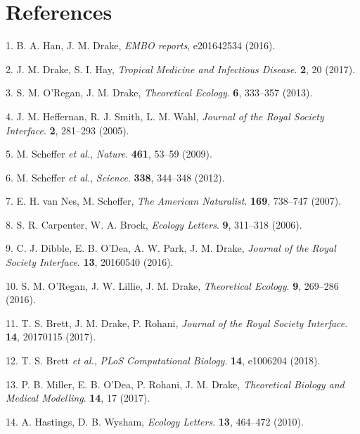 \documentclass[3p]{elsarticle} %
\begin{document}
\section*{References}\label{references}

\hypertarget{refs}{}
\hypertarget{ref-Han2016}{}
1. B. A. Han, J. M. Drake, \emph{EMBO reports}, e201642534 (2016).

\hypertarget{ref-Drake2017}{}
2. J. M. Drake, S. I. Hay, \emph{Tropical Medicine and Infectious
Disease}. \textbf{2}, 20 (2017).

\hypertarget{ref-ORegan2013}{}
3. S. M. O'Regan, J. M. Drake, \emph{Theoretical Ecology}. \textbf{6},
333--357 (2013).

\hypertarget{ref-Heffernan2005}{}
4. J. M. Heffernan, R. J. Smith, L. M. Wahl, \emph{Journal of the Royal
Society Interface}. \textbf{2}, 281--293 (2005).

\hypertarget{ref-Scheffer2009}{}
5. M. Scheffer \emph{et al.}, \emph{Nature}. \textbf{461}, 53--59
(2009).

\hypertarget{ref-Scheffer2012}{}
6. M. Scheffer \emph{et al.}, \emph{Science}. \textbf{338}, 344--348
(2012).

\hypertarget{ref-VanNes2007}{}
7. E. H. van Nes, M. Scheffer, \emph{The American Naturalist}.
\textbf{169}, 738--747 (2007).

\hypertarget{ref-Carpenter2006}{}
8. S. R. Carpenter, W. A. Brock, \emph{Ecology Letters}. \textbf{9},
311--318 (2006).

\hypertarget{ref-Dibble2016}{}
9. C. J. Dibble, E. B. O'Dea, A. W. Park, J. M. Drake, \emph{Journal of
the Royal Society Interface}. \textbf{13}, 20160540 (2016).

\hypertarget{ref-ORegan2016}{}
10. S. M. O'Regan, J. W. Lillie, J. M. Drake, \emph{Theoretical
Ecology}. \textbf{9}, 269--286 (2016).

\hypertarget{ref-Brett2017}{}
11. T. S. Brett, J. M. Drake, P. Rohani, \emph{Journal of the Royal
Society Interface}. \textbf{14}, 20170115 (2017).

\hypertarget{ref-Brett2018}{}
12. T. S. Brett \emph{et al.}, \emph{PLoS Computational Biology}.
\textbf{14}, e1006204 (2018).

\hypertarget{ref-Miller2017}{}
13. P. B. Miller, E. B. O'Dea, P. Rohani, J. M. Drake, \emph{Theoretical
Biology and Medical Modelling}. \textbf{14}, 17 (2017).

\hypertarget{ref-Hastings2010}{}
14. A. Hastings, D. B. Wysham, \emph{Ecology Letters}. \textbf{13},
464--472 (2010).
\end{document}
